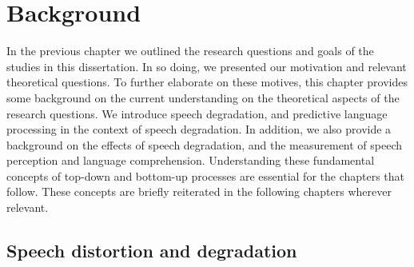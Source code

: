 \documentclass[a4paper, nobind]{templates/ociamthesis}
\begin{document}
\hypertarget{background}{%
\chapter{Background}\label{background}}

In the previous chapter we outlined the research questions and goals of the studies in this dissertation.
In so doing, we presented our motivation and relevant theoretical questions.
To further elaborate on these motives, this chapter provides some background on the current understanding on the theoretical aspects of the research questions.
We introduce speech degradation, and predictive language processing in the context of speech degradation.
In addition, we also provide a background on the effects of speech degradation, and the measurement of speech perception and language comprehension.
Understanding these fundamental concepts of top-down and bottom-up processes are essential for the chapters that follow.
These concepts are briefly reiterated in the following chapters wherever relevant.

\hypertarget{speech-distortion-and-degradation}{%
\section{Speech distortion and degradation}\label{speech-distortion-and-degradation}}
\end{document}
